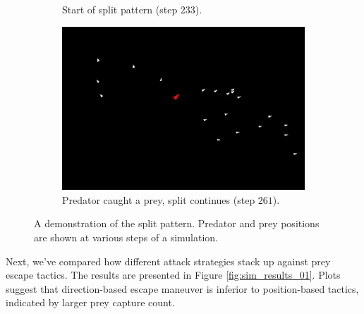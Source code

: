 \documentclass[9pt]{pnas-new}
\begin{document}
\begin{figure}[h]
\begin{subfigure}[t]{0.3\linewidth}
        \caption{Start of split pattern (step $233$).}
    \end{subfigure}%
    \hspace{0.02\linewidth} %
    \begin{subfigure}[t]{0.3\linewidth}
        \includegraphics[width=\linewidth]{boids_step_261.jpg}
        \caption{Predator caught a prey, split continues (step $261$).}
    \end{subfigure}
    \caption{A demonstration of the split pattern. Predator and prey positions
	are shown at various steps of a simulation.}
	\label{fig:sim_split}
\end{figure}
Next, we've compared how different attack strategies stack up against prey escape tactics. The
results are presented in Figure \ref{fig:sim_results_01}. Plots suggest that
direction-based escape maneuver is inferior to position-based tactics, indicated by larger prey
capture count.
\end{document}
